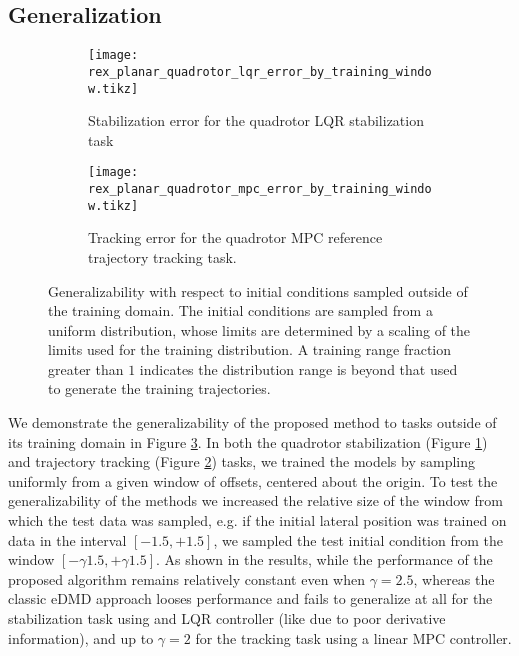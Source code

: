 \documentclass{article}
\begin{document}
\subsection{Generalization}
\begin{figure}[t] \centering
  \begin{subfigure}[t]{0.48\textwidth}
    \texttt{[image: rex\_planar\_quadrotor\_lqr\_error\_by\_training\_window.tikz]}
    \caption{Stabilization error for the quadrotor LQR stabilization task}
    \label{fig:rex_planar_quadrotor_lqr_error_by_training_window}
  \end{subfigure}
  \hfill
  \begin{subfigure}[t]{0.49\textwidth}
    \raggedright
    \texttt{[image: rex\_planar\_quadrotor\_mpc\_error\_by\_training\_window.tikz]}
    \caption{Tracking error for the quadrotor MPC reference trajectory tracking task.}
    \label{fig:rex_planar_quadrotor_mpc_error_by_training_window}
  \end{subfigure}
  \caption{Generalizability with respect to initial conditions sampled outside of the 
  training domain. The initial conditions are sampled from a uniform distribution, whose 
  limits are determined by a scaling of the limits used for the training distribution. 
  A training range fraction greater than $1$ indicates the
  distribution range is beyond that used to generate the training trajectories.
  }
  \label{fig:training_window}
\end{figure}


We demonstrate the generalizability of the proposed method to tasks outside of its training
domain in Figure \ref{fig:training_window}. In both the quadrotor 
stabilization (Figure \ref{fig:rex_planar_quadrotor_lqr_error_by_training_window}) and 
trajectory tracking (Figure \ref{fig:rex_planar_quadrotor_mpc_error_by_training_window})
tasks, we trained the models by sampling uniformly from a given window of offsets, centered 
about the origin. 
To test the generalizability of the methods we increased the relative size of the window 
from which the test data was sampled, e.g. if the initial lateral position was trained on 
data in the interval $[-1.5,+1.5]$, we sampled the test initial condition from the window 
$[-\gamma 1.5, +\gamma 1.5]$. As shown in the results, while the performance of the proposed
algorithm remains relatively constant even when $\gamma = 2.5$, whereas the classic eDMD 
approach looses performance and fails to generalize at all for the stabilization task using 
and LQR controller (like due to poor derivative information), and up to $\gamma = 2$ for the 
tracking task using a linear MPC controller.
\end{document}
